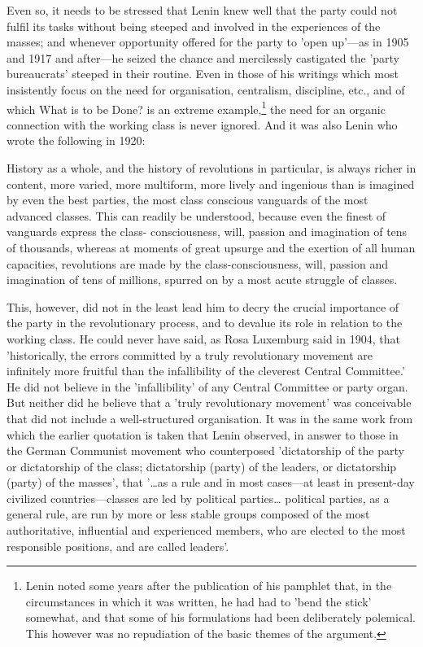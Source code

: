 Even so, it needs to be stressed that Lenin knew well that the party could not fulfil its tasks without being steeped and involved in the experiences of the masses; and whenever opportunity offered for the party to 'open up'—as in 1905 and 1917 and after—he seized the chance and mercilessly castigated the 'party bureaucrats' steeped in their routine. Even in those of his writings which most insistently focus on the need for organisation, centralism, discipline, etc., and of which What is to be Done? is an extreme example,\footnote{Lenin noted some years after the publication of his pamphlet that, in the circumstances in which it was written, he had had to 'bend the stick' somewhat, and that some of his formulations had been deliberately polemical. This however was no repudiation of the basic themes of the argument.} the need for an organic connection with the working class is never ignored. And it was also Lenin who wrote the following in 1920:
\begin{displayquote}
    History as a whole, and the history of revolutions in particular, is always richer in content, more varied, more multiform, more lively and ingenious than is imagined by even the best parties, the most class conscious vanguards of the most advanced classes. This can readily be understood, because even the finest of vanguards express the class- consciousness, will, passion and imagination of tens of thousands, whereas at moments of great upsurge and the exertion of all human capacities, revolutions are made by the class-consciousness, will, passion and imagination of tens of millions, spurred on by a most acute struggle of classes.
\end{displayquote}

This, however, did not in the least lead him to decry the crucial importance of the party in the revolutionary process, and to devalue its role in relation to the working class. He could never have said, as Rosa Luxemburg said in 1904, that 'historically, the errors committed by a truly revolutionary movement are infinitely more fruitful than the infallibility of the cleverest Central Committee.' He did not believe in the 'infallibility' of any Central Committee or party organ. But neither did he believe that a 'truly revolutionary movement' was conceivable that did not include a well-structured organisation. It was in the same work from which the earlier quotation is taken that Lenin observed, in answer to those in the German Communist movement who counterposed 'dictatorship of the party or dictatorship of the class; dictatorship (party) of the leaders, or dictatorship (party) of the masses', that '\dots{}as a rule and in most cases—at least in present-day civilized countries—classes are led by political parties\dots{} political parties, as a general rule, are run by more or less stable groups composed of the most authoritative, influential and experienced members, who are elected to the most responsible positions, and are called leaders'.

